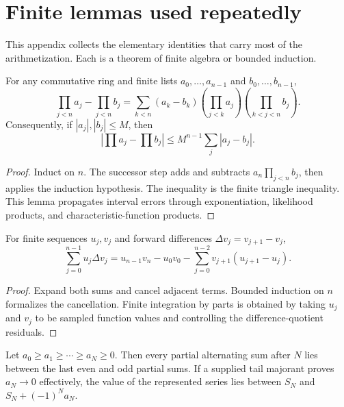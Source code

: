\section{Finite lemmas used repeatedly}\label{app:finite-lemmas}

This appendix collects the elementary identities that carry most of the arithmetization.  Each is a theorem of finite algebra or bounded induction.

\begin{lemma}\label{lem:product-telescope}
For any commutative ring and finite lists $a_0,\dots,a_{n-1}$ and $b_0,\dots,b_{n-1}$,
\begin{equation}\label{eq:product-telescope}
 \prod_{j<n}a_j-\prod_{j<n}b_j
 =\sum_{k<n}(a_k-b_k)
   \left(\prod_{j<k}a_j\right)
   \left(\prod_{k<j<n}b_j\right).
\end{equation}
Consequently, if $|a_j|,|b_j|\le M$, then
\[
 \left|\prod a_j-\prod b_j\right|
 \le M^{n-1}\sum_j|a_j-b_j|.
\]
\end{lemma}

\begin{proof}
Induct on $n$.  The successor step adds and subtracts
$a_n\prod_{j<n}b_j$, then applies the induction hypothesis.  The inequality is the finite triangle inequality.  This lemma propagates interval errors through exponentiation, likelihood products, and characteristic-function products.
\end{proof}

\begin{lemma}\label{lem:summation-parts}
For finite sequences $u_j,v_j$ and forward differences
$\Delta v_j=v_{j+1}-v_j$,
\begin{equation}\label{eq:summation-parts}
 \sum_{j=0}^{n-1}u_j\Delta v_j
 =u_{n-1}v_n-u_0v_0-\sum_{j=0}^{n-2}v_{j+1}(u_{j+1}-u_j).
\end{equation}
\end{lemma}

\begin{proof}
Expand both sums and cancel adjacent terms.  Bounded induction on $n$ formalizes the cancellation.  Finite integration by parts is obtained by taking $u_j$ and $v_j$ to be sampled function values and controlling the difference-quotient residuals.
\end{proof}

\begin{lemma}\label{lem:alternating}
Let $a_0\ge a_1\ge\cdots\ge a_N\ge0$.  Then every partial alternating sum after $N$ lies between the last even and odd partial sums.  If a supplied tail majorant proves $a_N\to0$ effectively, the value of the represented series lies between $S_N$ and $S_N+(-1)^Na_N$.
\end{lemma}

